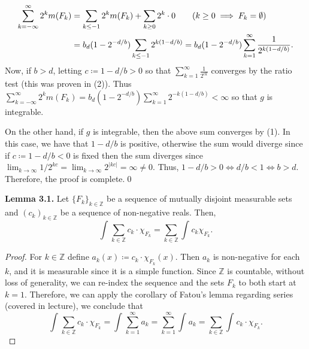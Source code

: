 \begin{align*}
	\sum_{k=-\infty}^{\infty}2^{k} m(F_{k} ) &= \sum_{k \leq - 1}^{}2^{k} m(F_{k} ) + \sum_{k \geq 0 }^{}2^{k} \cdot 0 \tag{\( k \geq 0 \implies F_{k} = \emptyset  \)} \\
						 &= b_{d} (1 - 2^{-d/b} )\sum_{k \leq - 1}^{} 2^{k(1 - d / b)} = b_{d} (1 - 2^{-d/b} )\sum_{k = 1}^{\infty} \frac{1}{2^{k(1 - d / b)}}.
\end{align*}
Now, if \( b > d \), letting \( c \coloneqq 1 - d/b > 0 \) so that \( \sum_{k=1}^{\infty} \frac{1}{2^{ck} }  \) converges by the ratio test (this was proven in (2)). Thus \( \sum_{k=-\infty}^{\infty}2^{k} m(F_{k} ) = b_{d} (1 - 2^{-d/b} )\sum_{k=1}^{\infty}2^{-k(1-d/b)} < \infty \) so that \( g \) is integrable. 


On the other hand, if \( g \) is integrable, then the above sum converges by (1). In this case, we have that \( 1 - d/b \) is positive, otherwise the sum would diverge since if \( c \coloneqq 1 - d/b < 0\) is fixed then the sum diverges since \( \lim_{{k} \to {\infty}} 1/2^{kc} = \lim_{{k} \to {\infty}}  2^{|kc|} = \infty \neq 0    \). Thus, \( 1 - d/b > 0 \iff d/b < 1 \iff b > d \). Therefore, the proof is complete.\qed

\noindent \textbf{Lemma 3.1.} Let \( \{ F_{k}  \}_{k \in \mathbb{Z} }   \) be a sequence of mutually disjoint measurable sets and \( (c_{k} )_{k \in \mathbb{Z} }  \) be a sequence of non-negative reals. Then, \[\int_{} \sum_{k \in \mathbb{Z} }^{} c_{k}\cdot \chi_{F_{k} } = \sum_{k \in \mathbb{Z} }^{} \int_{} c_{k} \chi_{F_{k} } .  \]
\begin{proof}
For \( k \in \mathbb{Z}  \) define \( a_{k}(x) \coloneqq c_{k}\cdot \chi_{F_{k} } (x)   \). Then \( a_{k}  \) is non-negative for each \( k \), and it is measurable since it is a simple function. Since \( \mathbb{Z}  \) is countable, without loss of generality, we can re-index the sequence and the sets \( F_{k} \) to both start at \( k = 1 \). Therefore, we can apply the corollary of Fatou's lemma regarding series (covered in lecture), we conclude that \[\int_{} \sum_{k\in \mathbb{Z} }^{}c_k\cdot\chi_{F_{k} } =  \int_{} \sum_{k=1}^{\infty}a_{k} = \sum_{k=1}^{\infty} \int_{} a_{k} = \sum_{k \in \mathbb{Z} }^{} \int_{} c_{k} \cdot \chi_{F_{k} } . \] 
\end{proof}

